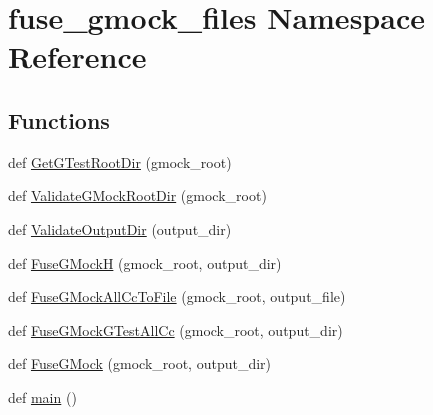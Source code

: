 \hypertarget{namespacefuse__gmock__files}{}\section{fuse\+\_\+gmock\+\_\+files Namespace Reference}
\label{namespacefuse__gmock__files}
\subsection*{Functions}
\begin{DoxyCompactItemize}
\item 
def \hyperlink{namespacefuse__gmock__files_aae591d77d2d969394996f9fc2017824c}{Get\+G\+Test\+Root\+Dir} (gmock\+\_\+root)
\item 
def \hyperlink{namespacefuse__gmock__files_aaec09f55a62b3d65b5d25fe0050e9e05}{Validate\+G\+Mock\+Root\+Dir} (gmock\+\_\+root)
\item 
def \hyperlink{namespacefuse__gmock__files_a68581e210793099d656537faa719df29}{Validate\+Output\+Dir} (output\+\_\+dir)
\item 
def \hyperlink{namespacefuse__gmock__files_abab451606f671f59404f23276aad2c34}{Fuse\+G\+MockH} (gmock\+\_\+root, output\+\_\+dir)
\item 
def \hyperlink{namespacefuse__gmock__files_af470a39a4df492b1ca0d9493eac8222b}{Fuse\+G\+Mock\+All\+Cc\+To\+File} (gmock\+\_\+root, output\+\_\+file)
\item 
def \hyperlink{namespacefuse__gmock__files_a50eb499fcb075e19191e8403bd85c813}{Fuse\+G\+Mock\+G\+Test\+All\+Cc} (gmock\+\_\+root, output\+\_\+dir)
\item 
def \hyperlink{namespacefuse__gmock__files_ae76b6bc18373325fc3f002abf5c4378f}{Fuse\+G\+Mock} (gmock\+\_\+root, output\+\_\+dir)
\item 
def \hyperlink{namespacefuse__gmock__files_a64e8cd1ead5a1454265cbc2d3db4d425}{main} ()
\end{DoxyCompactItemize}
